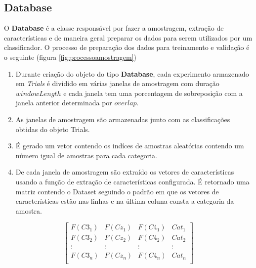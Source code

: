 \subsection{Database}
\par O \textbf{Database} \'e a classe respons\'avel por fazer a amostragem, extra\c{c}\~ao de caracter\'isticas e de maneira geral preparar os dados para serem utilizados por um classificador. O processo de prepara\c{c}\~ao dos dados para treinamento e valida\c{c}\~ao \'e o seguinte (figura \ref{fig:processoamostragem})
\begin{enumerate}
	\item Durante cria\c{c}\~ao do objeto do tipo \textbf{Database}, cada experimento  armazenado em \textit{Trials} \'e dividido em v\'arias janelas de amostragem com dura\c{c}\~ao $windowLength$ e cada janela tem uma porcentagem de sobreposi\c{c}\~ao com a janela anterior determinada por $overlap$.
	\item As janelas de amostragem s\~ao armazenadas junto com as classifica\c{c}\~oes obtidas do objeto Trials.
	\item \'E gerado um vetor contendo os ind\'ices de amostras aleat\'orias contendo um n\'umero igual de amostras para cada categoria.
	\item De cada janela de amostragem s\~ao extra\'ido os vetores de caracter\'isticas usando a fun\c{c}\~ao de extra\c{c}\~ao de caracter\'isticas configurada. \'E retornado uma matriz contendo o Dataset seguindo o padr\~ao em que os vetores de caracter\'isticas est\~ao nas linhas e na \'ultima coluna consta a categoria da amostra.
\end{enumerate}
\begin{equation}
\left[
\begin{array}{cccc}
F(C3_1) &  F(Cz_1) & F(C4_1) & Cat_1\\ 
F(C3_2) &  F(Cz_2) & F(C4_2) & Cat_2\\ 
\vdots & \vdots & \vdots &\vdots \\
F(C3_n) &  F(Cz_n) & F(C4_n) & Cat_n\\ 
\end{array}
\right]
\end{equation}

